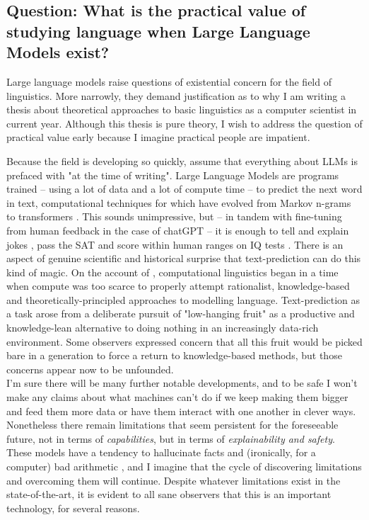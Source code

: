\begin{fullwidth}

\section{\textbf{Question:} What is the practical value of studying language when Large Language Models exist?}

Large language models raise questions of existential concern for the field of linguistics. More narrowly, they demand justification as to why I am writing a thesis about theoretical approaches to basic linguistics as a computer scientist in current year. Although this thesis is pure theory, I wish to address the question of practical value early because I imagine practical people are impatient.

 Because the field is developing so quickly, assume that everything about LLMs is prefaced with "at the time of writing". Large Language Models are programs trained -- using a lot of data and a lot of compute time -- to predict the next word in text, computational techniques for which have evolved from Markov n-grams to transformers \citep{vaswani_attention_2017}. This sounds unimpressive, but -- in tandem with fine-tuning from human feedback in the case of chatGPT \citep{openai_chatgpt_2022} -- it is enough to tell and explain jokes \citep{bastian_google_2022}, pass the SAT \citep{teddy_teddynpc_i_2022} and score within human ranges on IQ tests \citep{thompson_gpt-35_2022}. There is an aspect of genuine scientific and historical surprise that text-prediction can do this kind of magic. On the account of \citep{mcshane_linguistics_2021}, computational linguistics began in a time when compute was too scarce to properly attempt rationalist, knowledge-based and theoretically-principled approaches to modelling language. Text-prediction as a task arose from a deliberate pursuit of "low-hanging fruit" as a productive and knowledge-lean alternative to doing nothing in an increasingly data-rich environment. Some observers \citep{church_pendulum_2011} expressed concern that all this fruit would be picked bare in a generation to force a return to knowledge-based methods, but those concerns appear now to be unfounded.\\

I'm sure there will be many further notable developments, and to be safe I won't make any claims about what machines can't do if we keep making them bigger and feed them more data or have them interact with one another in clever ways. Nonetheless there remain limitations that seem persistent for the foreseeable future, not in terms of \emph{capabilities}, but in terms of \emph{explainability and safety}. These models have a tendency to hallucinate facts and (ironically, for a computer) bad arithmetic \citep{hendrycks_measuring_2021}, and I imagine that the cycle of discovering limitations and overcoming them will continue. Despite whatever limitations exist in the state-of-the-art, it is evident to all sane observers that this is an important technology, for several reasons.


\end{fullwidth}
